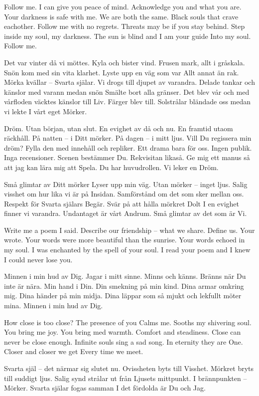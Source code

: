 \startpoem
Follow me.
I can give you peace of mind.
Acknowledge you and what you are.
Your darkness is safe with me.
We are both the same.
Black souls that crave eachother.
Follow me with no regrets.
Threats may be if you stay behind.
Step inside my soul, my darkness.
The sun is blind and I am your guide
Into my soul.
Follow me.
\stoppoem

\startpoem
Det var vinter då vi möttes.
Kyla och bister vind.
Frusen mark, allt i gråskala.
Snön kom med sin vita klarhet.
Lyste upp en väg som var 
Allt annat än rak.
Mörka kvällar – Svarta själar.
Vi drogs till djupet av varandra.
Delade tankar och känslor med varann medan snön
Smälte bort alla gränser.
Det blev vår och med vårfloden väcktes känslor till
Liv.
Färger blev till.
Solstrålar bländade oss medan vi lekte 
I vårt eget
Mörker.
\stoppoem

\startpoem
Dröm.
Utan början, utan slut.
En evighet av då och nu.
En framtid utaom räckhåll.
På natten – i Ditt mörker.
På dagen – i mitt ljus.
Vill Du regissera min dröm?
Fylla den med innehåll och repliker.
Ett drama bara för oss.
Ingen publik.
Inga recensioner.
Scenen bestämmer Du.
Rekvisitan likaså.
Ge mig ett manus så att jag kan lära mig att
Spela.
Du har huvudrollen.
Vi leker en
Dröm.
\stoppoem

\linetocenter{}
\startpoem
Små glimtar av Ditt mörker
Lyser upp min väg.
Utan mörker – inget ljus.
Salig visshet om hur lika vi är på 
Insidan.
Samförstånd om det som sker mellan oss.
Respekt för Svarta själars
Begär.
Svär på att hålla mörkret
Dolt
I en evighet finner vi varandra.
Undantaget är vårt
Andrum.
Små glimtar av det som är
Vi.
\stoppoem

\linetocenter{}
\startpoem
Write me a poem I said.
Describe our friendship – what we share.
Define us.
Your wrote.
Your words were more beautiful than the sunrise.
Your words echoed in my soul.
I was enchanted by the spell of your soul.
I read your poem and I knew
I could never lose you.
\stoppoem

\linetocenter{}
\startpoem
Minnen i min hud av Dig.
Jagar i mitt sinne.
Minns och känns.
Bränns när Du inte är nära.
Min hand i Din.
Din smekning på min kind.
Dina armar omkring mig.
Dina händer på min midja.
Dina läppar som så mjukt och lekfullt möter mina.
Minnen i min hud av Dig.
\stoppoem

\linetocenter{}
\startpoem
How close is too close?
The presence of you
Calms me.
Sooths my shivering soul.
You bring me joy.
You bring med warmth.
Comfort and steadiness.
Close can never be close enough.
Infinite souls sing a sad song.
In eternity they are 
One.
Closer and closer we get
Every time we meet.
\stoppoem

\linetocenter{}
\startpoem
Svarta själ – 
det närmar sig slutet nu.
Ovissheten byts till 
Visshet.
Mörkret bryts till suddigt ljus.
Salig synd strålar ut från 
Ljusets mittpunkt.
I brännpunkten – 
Mörker.
Svarta själar fogas samman
I det fördolda är
Du och Jag.
\stoppoem

\bye
